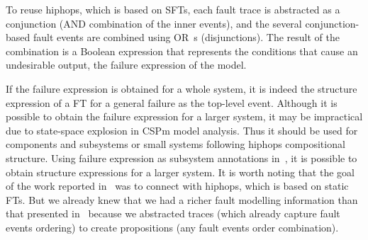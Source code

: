 \documentclass[12pt,openright,twoside,a4paper,oldfontcommands,english,brazil,draft]{abntex2}
\theoremstyle{theo}
\begin{document}
To reuse \ac{hiphops}, which is based on \acp{SFT}, each fault trace is abstracted as a conjunction (\ac{AND} combination of the inner events), and the several conjunction-based fault events are combined using \ac{OR}\ s (disjunctions).
%
The result of the combination is a Boolean expression that represents the conditions that cause an undesirable output, the failure expression of the model.

If the failure expression is obtained for a whole system, it is indeed the structure expression of a \acl{FT} for a general failure as the top-level event.
Although it is possible to obtain the failure expression for a larger system, it may be impractical due to state-space explosion in \ac{CSPm} model analysis.
Thus it should be used for components and subsystems or small systems following \ac{hiphops} compositional structure.
%
Using failure expression as subsystem annotations in~\cite{PMS+2001}, it is possible to obtain structure expressions for a larger system.
It is worth noting that the goal of the work reported in~\cite{DM2012} was to connect with \ac{hiphops}, which is based on static \aclp{FT}.
But we already knew that we had a richer fault modelling information than that presented in~\cite{DM2012} because we abstracted traces (which already capture fault events ordering) to create propositions (any fault events order combination).

\end{document}
